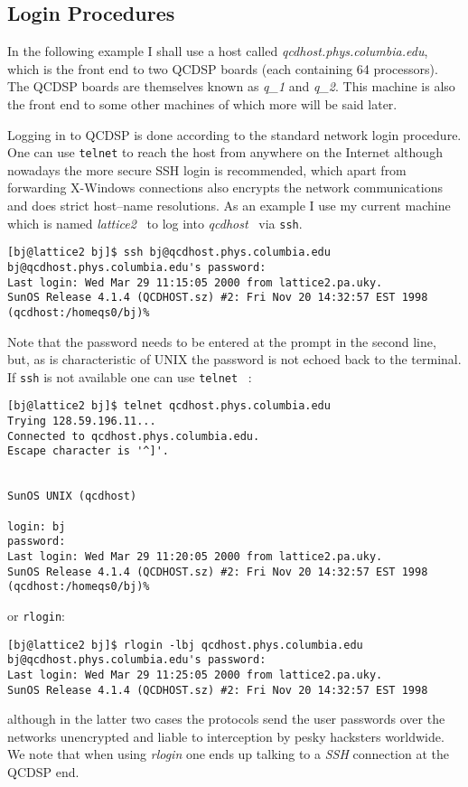 \subsection{Login Procedures}
In the following example I shall use a host called 
{\em qcdhost.phys.columbia.edu}, which is the front end to two QCDSP 
boards (each containing 64 processors). The QCDSP boards are themselves
known as {\em q\_1} and {\em q\_2}. This machine 
is also the front end to some other machines of which more will be said later.

Logging in to QCDSP is done according to the standard network login procedure.
One can use {\tt telnet} to reach the host from anywhere on the Internet
although nowadays the more secure SSH login is recommended, which apart
from forwarding X-Windows connections also encrypts the network 
communications and does strict host--name resolutions. As an example I use
my current machine which is named {\em lattice2} \ to log into {\em qcdhost} \
via {\tt ssh}.

\begin{verbatim}
[bj@lattice2 bj]$ ssh bj@qcdhost.phys.columbia.edu
bj@qcdhost.phys.columbia.edu's password: 
Last login: Wed Mar 29 11:15:05 2000 from lattice2.pa.uky.
SunOS Release 4.1.4 (QCDHOST.sz) #2: Fri Nov 20 14:32:57 EST 1998
(qcdhost:/homeqs0/bj)%
\end{verbatim}

Note that the password needs to be entered at the prompt in the second
line, but, as is characteristic of UNIX the password is not echoed back to the 
terminal. If {\tt ssh} is not available one can use {\tt telnet} \ :
\begin{verbatim}
[bj@lattice2 bj]$ telnet qcdhost.phys.columbia.edu
Trying 128.59.196.11...
Connected to qcdhost.phys.columbia.edu.
Escape character is '^]'.


SunOS UNIX (qcdhost)

login: bj
password:
Last login: Wed Mar 29 11:20:05 2000 from lattice2.pa.uky.
SunOS Release 4.1.4 (QCDHOST.sz) #2: Fri Nov 20 14:32:57 EST 1998
(qcdhost:/homeqs0/bj)%
\end{verbatim}
or {\tt rlogin}:
\begin{verbatim}
[bj@lattice2 bj]$ rlogin -lbj qcdhost.phys.columbia.edu
bj@qcdhost.phys.columbia.edu's password: 
Last login: Wed Mar 29 11:25:05 2000 from lattice2.pa.uky.
SunOS Release 4.1.4 (QCDHOST.sz) #2: Fri Nov 20 14:32:57 EST 1998
\end{verbatim}
although in the latter two cases the protocols send the user
passwords over the networks unencrypted and liable to interception
by pesky hacksters worldwide. We note that when using {\em rlogin}
one ends up talking to a {\em SSH} connection at the QCDSP end.

